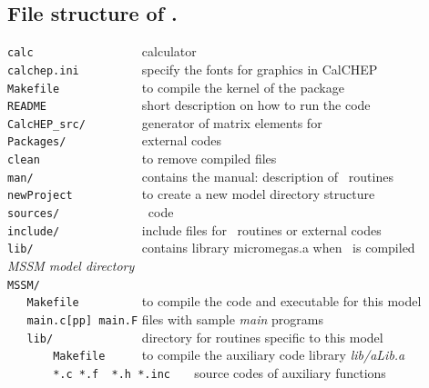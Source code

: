 \documentclass[12pt,a4paper]{article}
\begin{document}
\subsection{File structure of \micro.}
\label{file_structure}
\verb|calc                | calculator\\
\verb|calchep.ini         | specify the fonts for graphics in CalCHEP\\
\verb|Makefile            |  to compile the kernel of the package               \\
\verb|README              | short description on how to run the code\\
\verb|CalcHEP_src/        |        generator of matrix elements for \micro   \\
\verb|Packages/           |        external codes    \\
\verb|clean               | to remove compiled files \\
\verb|man/                |    contains the manual: description of \micro\ routines \\
\verb|newProject          |     to create a new model directory   structure                           \\
\verb|sources/            |        \micro\ code                               \\
\verb|include/            |        include files for \micro\ routines or external codes                              \\
\verb|lib/                |        contains library micromegas.a when \micro\ is compiled                               \\
{\it MSSM model directory}                                                          \\
\verb|MSSM/               |                                                      \\
\verb|   Makefile         |  to compile the code and executable for  this model \\
\verb|   main.c[pp] main.F|       files with sample {\it main} programs      \\
\verb|   lib/             |      directory for routines specific to this model   \\
\verb|       Makefile     |   to compile the auxiliary code library {\it lib/aLib.a}    \\
\verb|       *.c *.f  *.h *.inc   |      source codes of auxiliary functions             \\
\end{document}
